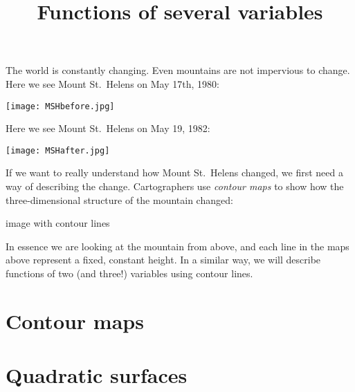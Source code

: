 \documentclass{ximera}
\title[Dig-In:]{Functions of several variables}
\begin{document}
\begin{abstract}
\end{abstract}
\maketitle


The world is constantly changing. Even mountains are not impervious to
change.  Here we see Mount St.\ Helens on May 17th, 1980:
\begin{image}
  \texttt{[image: MSHbefore.jpg]}
\end{image}

Here we see Mount St.\ Helens on May 19, 1982:
\begin{image}
  \texttt{[image: MSHafter.jpg]}
\end{image}
If we want to really understand how Mount St.\ Helens changed, we
first need a way of describing the change. Cartographers use
\textit{contour maps} to show how the three-dimensional structure of
the mountain changed:
\begin{image}
image with contour lines
\end{image}
In essence we are looking at the mountain from above, and each line in
the maps above represent a fixed, constant height.  In a similar way,
we will describe functions of two (and three!)  variables using
contour lines.


\section{Contour maps}


\section{Quadratic surfaces}
\end{document}
